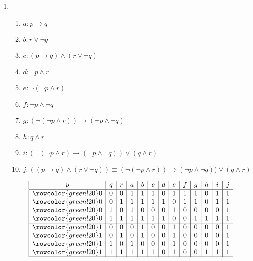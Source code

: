 \documentclass{article}
\begin{document}
\begin{enumerate}[label=(\alph*)]
\begin{enumerate}[label=\roman*.]
        \item
        \begin{enumerate}[label={}]         
            \item $a: p\rightarrow{}q$  
            \item $b: r\lor{}\lnot{}q$
            \item $c: (p\rightarrow{}q)\land{}(r\lor{}\lnot{}q)$
            \item $d: \lnot{}p\land{}r$
            \item $e: \lnot{}(\lnot{}p\land{}r)$
            \item $f: \lnot{}p\land{}\lnot{}q$
            \item $g: (\lnot{}(\lnot{}p\land{}r))\rightarrow{}(\lnot{}p\land{}\lnot{}q)$
            \item $h: q\land{}r$
            \item $i: (\lnot{}(\lnot{}p\land{}r)\rightarrow{}(\lnot{}p\land{}\lnot{}q))\lor{}(q\land{}r)$
            \item $j: ((p\rightarrow{}q)\land{}(r\lor{}\lnot{}q))\equiv{}(\lnot{}(\lnot{}p\land{}r))\rightarrow{}(\lnot{}p\land{}\lnot{}q))\lor{}(q\land{}r)$
        \end{enumerate}
        \begin{displaymath}
            \begin{array}{|c|c|c|c|c|c|c|c|c|c|c|c|c}
               p & q & r & a & b & c & d & e & f & g & h & i & j\\
            \hline
            \rowcolor{green!20}
            0 & 0 & 0 & 1 & 1 & 1 & 0 & 1 & 1 & 1 & 0 & 1 & 1 \\
            \rowcolor{green!20}
            0 & 0 & 1 & 1 & 1 & 1 & 1 & 0 & 1 & 1 & 0 & 1 & 1 \\
            \rowcolor{green!20}
            0 & 1 & 0 & 1 & 0 & 0 & 0 & 1 & 0 & 0 & 0 & 0 & 1 \\
            \rowcolor{green!20}
            0 & 1 & 1 & 1 & 1 & 1 & 1 & 0 & 0 & 1 & 1 & 1 & 1 \\
            \hline
            \rowcolor{green!20}
            1 & 0 & 0 & 0 & 1 & 0 & 0 & 1 & 0 & 0 & 0 & 0 & 1 \\
            \rowcolor{green!20}
            1 & 0 & 1 & 0 & 1 & 0 & 0 & 1 & 0 & 0 & 0 & 0 & 1 \\
            \rowcolor{green!20}
            1 & 1 & 0 & 1 & 0 & 0 & 0 & 1 & 0 & 0 & 0 & 0 & 1 \\
            \rowcolor{green!20}
            1 & 1 & 1 & 1 & 1 & 1 & 0 & 1 & 0 & 0 & 1 & 1 & 1 \\
            \hline
            \end{array}
        \end{displaymath}
        

\end{enumerate}
\end{enumerate}
\end{document}
